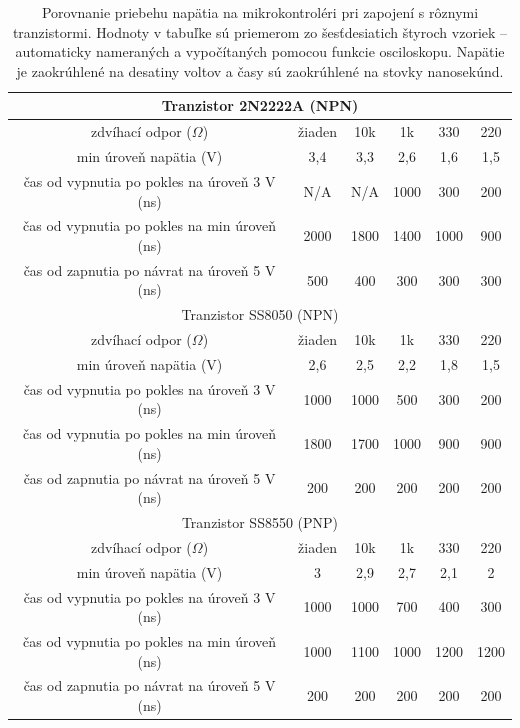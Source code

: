 \begin{table}
    \caption[Porovnanie priebehu napätia pri zapojení s rôznymi tranzistormi]{Porovnanie priebehu napätia na mikrokontroléri pri zapojení s rôznymi tranzistormi. Hodnoty v tabuľke sú priemerom zo šesťdesiatich štyroch vzoriek -- automaticky nameraných a vypočítaných pomocou funkcie osciloskopu. Napätie je zaokrúhlené na desatiny voltov a časy sú zaokrúhlené na stovky nanosekúnd.}
    \label{tab:oscVoltage}
    \begin{center}
    \begin{tabular}{|c|c|c|c|c|c|}
        \hline
        \multicolumn{6}{|c|}{Tranzistor 2N2222A (NPN)} \\
        \hline 
        zdvíhací odpor ($\Omega$) & žiaden & 10k & 1k & 330 & 220 \\
        \hline
        min úroveň napätia (V) & 3,4 & 3,3 & 2,6 & 1,6 & 1,5 \\
        \hline
        čas od vypnutia po pokles na úroveň 3 V (ns) & N/A & N/A & 1000 & 300 & 200 \\
        \hline
        čas od vypnutia po pokles na min úroveň (ns) & 2000 & 1800 & 1400 & 1000 & 900 \\
        \hline
        čas od zapnutia po návrat na úroveň 5 V (ns) & 500 & 400 & 300 & 300 & 300 \\
        \hline
        \multicolumn{6}{|c|}{Tranzistor SS8050 (NPN)} \\
        \hline 
        zdvíhací odpor ($\Omega$) & žiaden & 10k & 1k & 330 & 220 \\
        \hline
        min úroveň napätia (V) & 2,6 & 2,5 & 2,2 & 1,8 & 1,5 \\
        \hline
        čas od vypnutia po pokles na úroveň 3 V (ns) & 1000 & 1000 & 500 & 300 & 200 \\
        \hline
        čas od vypnutia po pokles na min úroveň (ns) & 1800 & 1700 & 1000 & 900 & 900 \\
        \hline
        čas od zapnutia po návrat na úroveň 5 V (ns) & 200 & 200 & 200 & 200 & 200 \\
        \hline
        \multicolumn{6}{|c|}{Tranzistor SS8550 (PNP)} \\
        \hline 
        zdvíhací odpor ($\Omega$) & žiaden & 10k & 1k & 330 & 220 \\
        \hline
        min úroveň napätia (V) & 3 & 2,9 & 2,7 & 2,1 & 2 \\
        \hline
        čas od vypnutia po pokles na úroveň 3 V (ns) & 1000 & 1000 & 700 & 400 & 300 \\
        \hline
        čas od vypnutia po pokles na min úroveň (ns) & 1000 & 1100 & 1000 & 1200 & 1200 \\
        \hline
        čas od zapnutia po návrat na úroveň 5 V (ns) & 200 & 200 & 200 & 200 & 200 \\
        \hline
    \end{tabular}
    \end{center}
\end{table}

